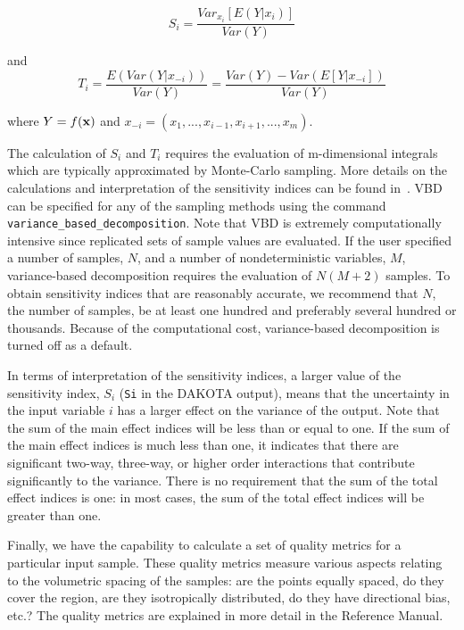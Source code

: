 \begin{equation}
S_{i}=\frac{Var_{x_{i}}[E(Y|x_{i})]}{Var(Y)} \label{eq:VBD_Si}
\end{equation}

and 
\begin{equation}
T_{i}=\frac{E(Var(Y|x_{-i}))}{Var(Y)}=\frac{Var(Y)-Var(E[Y|x_{-i}])}{Var(Y)} \label{eq:VBD_Ti}
\end{equation}

where $Y=f({\bf x})$ and ${x_{-i}=(x_{1},...,x_{i-1},x_{i+1},...,x_{m})}$.

The calculation of $S_{i}$ and $T_{i}$ requires the evaluation of 
m-dimensional integrals which are typically approximated by Monte-Carlo 
sampling. More details on the
calculations and interpretation of the sensitivity indices can be
found in~\cite{Sal04}. VBD can be specified for any of the sampling 
methods using the command \texttt{variance\_based\_decomposition}.
Note that VBD is extremely computationally
intensive since replicated sets of sample values are evaluated. If the
user specified a number of samples, $N$, and a number of
nondeterministic variables, $M$, variance-based decomposition
requires the evaluation of $N(M+2)$ samples. To obtain
sensitivity indices that are reasonably accurate, we recommend that
$N$, the number of samples, be at least one hundred and
preferably several hundred or thousands. Because of the computational
cost, variance-based decomposition is turned off as a default.

In terms of interpretation of the sensitivity indices, a larger value of
the sensitivity index, $S_{i}$ (\texttt{Si} in the DAKOTA output),
means that the uncertainty in the input variable $i$ has a
larger effect on the variance of the output. Note that the 
sum of the main effect indices will be less than or equal to one. 
If the sum of the main effect indices is much less than one, 
it indicates that there are significant two-way, three-way, or higher
order interactions that contribute significantly to the variance. 
There is no requirement that the sum of the total effect indices 
is one:  in most cases, the sum of the total effect indices will be 
greater than one. 

Finally, we have the capability to calculate a set of quality metrics 
for a particular input sample.  These quality metrics measure 
various aspects relating to the volumetric spacing of the samples: 
are the points equally spaced, do they cover the region, are they 
isotropically distributed, do they have directional bias, etc.? 
The quality metrics are explained in more detail in the Reference Manual.




